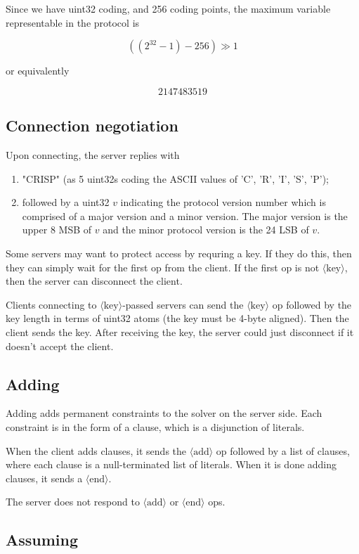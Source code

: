 \documentclass{article}
\newcommand\proto[1]{$\langle\mbox{#1}\rangle$}
\begin{document}
Since we have uint32 coding, and 256 coding points, the maximum variable
representable in the protocol is

 $$((2^{32}-1) - 256) \gg 1$$

or equivalently

 $$2147483519$$

 \subsection{Connection negotiation}

Upon connecting, the server replies with 
\begin{enumerate}
	\item "CRISP" (as 5 uint32s coding the ASCII values of 'C', 'R', 'I', 'S', 'P');
	\item followed by a uint32 $v$ indicating the protocol version number which is comprised of a
major version and a minor version.  The major version is the upper 8 MSB
of $v$ and the minor protocol version is the 24 LSB of $v$.
\end{enumerate}

Some servers may want to protect access by requring a key.  If they do this,
then they can simply wait for the first op from the client.  If the first op
is not \proto{key}, then the server can disconnect the client.

Clients connecting to \proto{key}-passed servers can send the \proto{key} op
followed by the key length in terms of uint32 atoms (the key must be 4-byte
aligned).  Then the client sends the key.  After receiving the key, the server
could just disconnect if it doesn't accept the client.

\subsection{Adding}

Adding adds permanent constraints to the solver on the server side.
Each constraint is in the form of a clause, which is a disjunction of
literals.

When the client adds clauses, it sends the \proto{add} op followed by
a list of clauses, where each clause is a null-terminated list
of literals.  When it is done adding clauses, it sends a \proto{end}.

The server does not respond to \proto{add} or \proto{end} ops.

\subsection{Assuming}
\end{document}
